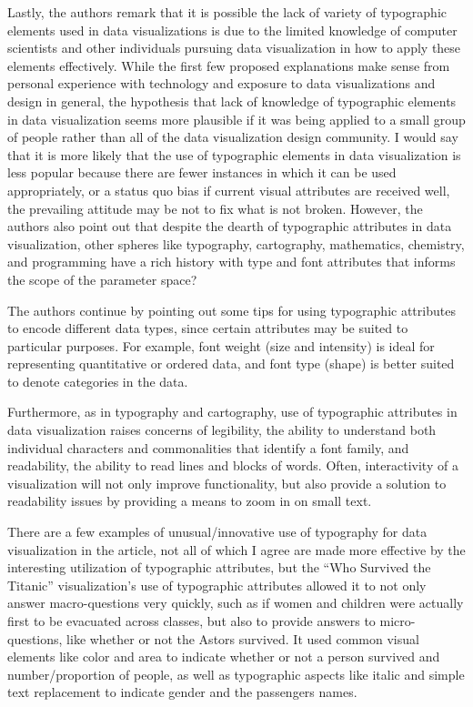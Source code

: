 \documentclass[]{book}
\theoremstyle{definition}
\theoremstyle{definition}
\theoremstyle{definition}
\theoremstyle{remark}
\begin{document}
Lastly, the authors remark that it is possible the lack of variety of
typographic elements used in data visualizations is due to the limited
knowledge of computer scientists and other individuals pursuing data
visualization in how to apply these elements effectively. While the
first few proposed explanations make sense from personal experience with
technology and exposure to data visualizations and design in general,
the hypothesis that lack of knowledge of typographic elements in data
visualization seems more plausible if it was being applied to a small
group of people rather than all of the data visualization design
community. I would say that it is more likely that the use of
typographic elements in data visualization is less popular because there
are fewer instances in which it can be used appropriately, or a status
quo bias if current visual attributes are received well, the prevailing
attitude may be not to fix what is not broken. However, the authors also
point out that despite the dearth of typographic attributes in data
visualization, other spheres like typography, cartography, mathematics,
chemistry, and programming have a rich history with type and font
attributes that informs the scope of the parameter space?

The authors continue by pointing out some tips for using typographic
attributes to encode different data types, since certain attributes may
be suited to particular purposes. For example, font weight (size and
intensity) is ideal for representing quantitative or ordered data, and
font type (shape) is better suited to denote categories in the data.

Furthermore, as in typography and cartography, use of typographic
attributes in data visualization raises concerns of legibility, the
ability to understand both individual characters and commonalities that
identify a font family, and readability, the ability to read lines and
blocks of words. Often, interactivity of a visualization will not only
improve functionality, but also provide a solution to readability issues
by providing a means to zoom in on small text.

There are a few examples of unusual/innovative use of typography for
data visualization in the article, not all of which I agree are made
more effective by the interesting utilization of typographic attributes,
but the ``Who Survived the Titanic'' visualization's use of typographic
attributes allowed it to not only answer macro-questions very quickly,
such as if women and children were actually first to be evacuated across
classes, but also to provide answers to micro-questions, like whether or
not the Astors survived. It used common visual elements like color and
area to indicate whether or not a person survived and number/proportion
of people, as well as typographic aspects like italic and simple text
replacement to indicate gender and the passengers names.
\end{document}
